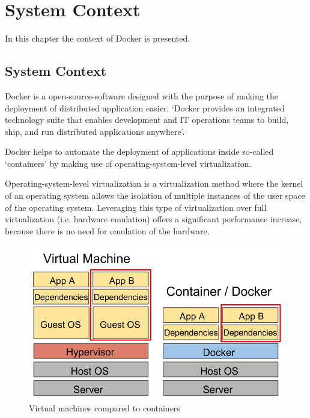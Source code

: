 \chapter{System Context}
\label{ch:context}

In this chapter the context of Docker is presented.

\section{System Context}
Docker is a open-source-software designed with the purpose of making the deployment of distributed application easier.
`Docker provides an integrated technology suite that enables development and IT operations teams to build, ship, and run distributed applications anywhere'\cite{whatisdocker}.

Docker helps to automate the deployment of applications inside so-called `containers' by making use of operating-system-level virtualization.

Operating-system-level virtualization is a virtualization method where the kernel of an operating system allows the isolation of multiple instances of the user space of the operating system. Leveraging this type of virtualization over full virtualization (i.e. hardware emulation) offers a significant performance increase, because there is no need for emulation of the hardware.\cite{VirtualizationTechnologies}

\begin{figure}[b!]
\centering
\includegraphics[scale=0.40,keepaspectratio=true]{./2-context/vmvsdocker}
\caption{Virtual machines compared to containers\cite{benchmarker}}
\label{fig:vmvsdocker}
\end{figure}

